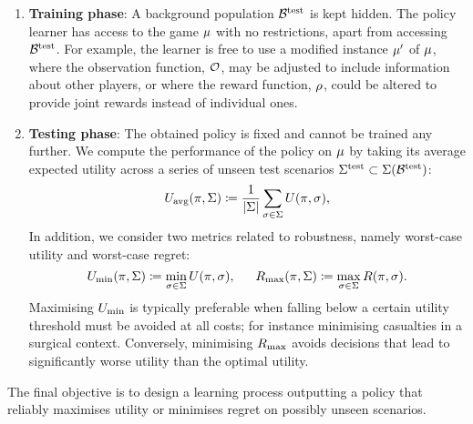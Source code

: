 \begin{enumerate}[leftmargin=12pt]
    \item \textbf{Training phase}: A background population $\mathcal{B}^\text{test}$ is kept hidden. The policy learner has access to the game $\mu$ with no restrictions, apart from accessing $\mathcal{B}^\text{test}$. For example, the learner is free to use a modified instance $\mu'$ of $\mu$, where the observation function, $\mathcal{O}$, may be adjusted to include information about other players, or where the reward function, $\rho$, could be altered to provide joint rewards instead of individual ones.
    \item \textbf{Testing phase}: The obtained policy is fixed and cannot be trained any further. We compute the performance of the policy on $\mu$ by taking its average expected utility across a series of unseen test scenarios $\Sigma^\text{test} \subset \Sigma(\mathcal{B}^\text{test})$:
  \begin{equation}
        \label{eq:metrics.performance}
        U_\text{avg}(\pi, \Sigma) \coloneqq \dfrac{1}{|\Sigma|}\sum_{\sigma \in \Sigma} U(\pi, \sigma),
    \end{equation}
    In addition, we consider two metrics related to robustness, namely worst-case utility and worst-case regret:
    \begin{equation}
        \label{eq:metrics.utiliy}
        U_\text{min}(\pi, \Sigma) \coloneqq \min_{\sigma \in \Sigma} U(\pi, \sigma), \quad\;\;  R_\text{max}(\pi, \Sigma) \coloneqq \max_{\sigma \in \Sigma} R(\pi, \sigma).
    \end{equation}
    Maximising $U_\text{min}$ is typically preferable when falling below a certain utility threshold must be avoided at all costs; for instance minimising casualties in a surgical context. Conversely, minimising $R_\text{max}$ avoids decisions that lead to significantly worse utility than the optimal utility. 
\end{enumerate}
The final objective is to design a learning process outputting a policy that reliably maximises utility or minimises regret on possibly unseen scenarios. 

